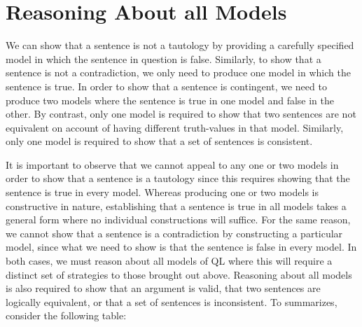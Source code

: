 \section{Reasoning About all Models}
\label{sec.allmodelreasoning}

We can show that a sentence is not a tautology by providing a carefully specified model in which the sentence in question is false.
Similarly, to show that a sentence is not a contradiction, we only need to produce one model in which the sentence is true.
In order to show that a sentence is contingent, we need to produce two models where the sentence is true in one model and false in the other.
By contrast, only one model is required to show that two sentences are not equivalent on account of having different truth-values in that model.
Similarly, only one model is required to show that a set of sentences is consistent.

It is important to observe that we cannot appeal to any one or two models in order to show that a sentence is a tautology since this requires showing that the sentence is true in every model.
Whereas producing one or two models is constructive in nature, establishing that a sentence is true in all models takes a general form where no individual constructions will suffice.
For the same reason, we cannot show that a sentence is a contradiction by constructing a particular model, since what we need to show is that the sentence is false in every model.
In both cases, we must reason about all models of QL where this will require a distinct set of strategies to those brought out above.
Reasoning about all models is also required to show that an argument is valid, that two sentences are logically equivalent, or that a set of sentences is inconsistent.
To summarizes, consider the following table:

